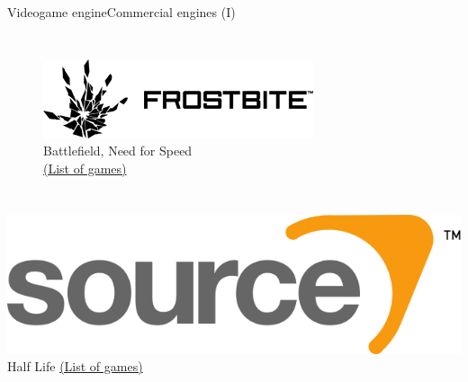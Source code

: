 \documentclass[10pt,compress]{beamer} %
\begin{document}
\begin{frame}{Videogame engine}{Commercial engines (I)}
\begin{columns}
\begin{figure}[t]
\begin{center}
			\bigskip

		    \includegraphics[width=0.8\linewidth]{figs/frostbite}\\
			\small{Battlefield, Need for Speed\\
			\href{https://en.wikipedia.org/wiki/List_of_Frostbite_games}{(List of games)}
			}
			\end{center}
   	 	\end{figure}
	\end{columns}
	\begin{center}
		    \includegraphics[width=0.3\linewidth]{figs/source}\\
			\small{Half Life \href{https://en.wikipedia.org/wiki/Source_(game_engine)}{(List of games)}}
	\end{center}
\end{frame}
\end{document}
